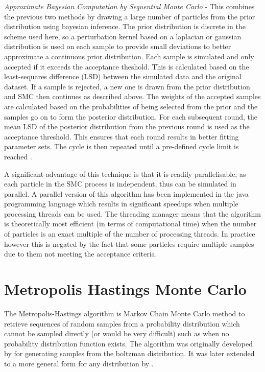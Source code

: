 \textit{Approximate Bayesian Computation by Sequential Monte Carlo} - This combines the previous two methods by drawing a large number of particles from the prior distribution using bayesian inference. The prior distribution is discrete in the scheme used here, so a perturbation kernel based on a laplacian or gaussian distribution is used on each sample to provide small deviations to better approximate a continuous prior distribution. Each sample is simulated and only accepted if it exceeds the acceptance theshold. This is calculated based on the least-sequares difference (LSD) between the simulated data and the original dataset. If a sample is rejected, a new one is drawn from the prior distribution and SMC then continues as described above. The weights of the accepted samples are calculated based on the probabilities of being selected from the prior and the samples go on to form the posterior distribution. For each subsequent round, the mean LSD of the posterior distribution from the previous round is used as the acceptance threshold. This ensures that each round results in better fitting parameter sets. The cycle is then repeated until a pre-defined cycle limit is reached \cite{Toni2009}.

A significant advantage of this technique is that it is readily parallelisable, as each particle in the SMC process is independent, thus can be simulated in parallel. A parallel version of this algorithm has been implemented in the java programming language which results in significant speedups when multiple processing threads can be used. The threading manager means that the algorithm is theoretically most efficient (in terms of computational time) when the number of particles is an exact multiple of the number of processing threads. In practice however this is negated by the fact that some particles require multiple samples due to them not meeting the acceptance criteria.


\section{Metropolis Hastings Monte Carlo}

The Metropolis-Hastings algorithm is Markov Chain Monte Carlo method to retrieve sequences of random samples from a probability distribution which cannot be sampled directly (or would be very difficult) such as when no probability distribution function exists. The algorithm was originally developed by \citet{Metropolis1953} for generating samples from the boltzman distribution. It was later extended to a more general form for any distribution by \citet{Hastings1970}.

